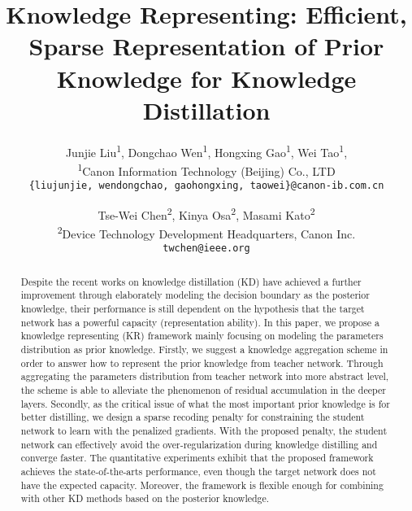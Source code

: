 \documentclass[10pt,twocolumn,letterpaper]{article}
\newcommand*{\affmark}[1][*]{\textsuperscript{#1}}
\begin{document}
\title{Knowledge Representing: Efficient, Sparse Representation of Prior Knowledge for Knowledge Distillation}

\author{
Junjie Liu\affmark[1],
Dongchao Wen\affmark[1],
Hongxing Gao\affmark[1],
Wei Tao\affmark[1],\\
\affmark[1]{Canon Information Technology (Beijing) Co., LTD}\\
{\tt\small \{liujunjie, wendongchao, gaohongxing, taowei\}@canon-ib.com.cn}
\and
Tse-Wei Chen\affmark[2],
Kinya Osa\affmark[2],
Masami Kato\affmark[2]\\
\affmark[2]{Device Technology Development Headquarters, Canon Inc.}\\
{\tt\small twchen@ieee.org}
}

\maketitle
\thispagestyle{empty}

\begin{abstract}
  Despite the recent works on knowledge distillation (KD) have achieved
  a further improvement through elaborately modeling
  the decision boundary as the posterior knowledge,
  their performance is still dependent on the hypothesis that
  the target network has a powerful capacity (representation ability).
  In this paper,
  we propose a knowledge representing (KR) framework mainly
  focusing on modeling the parameters distribution as prior knowledge.
  Firstly,
  we suggest a knowledge aggregation scheme
  in order to answer how to represent the prior knowledge from teacher network.
  Through aggregating the parameters distribution from
  teacher network into more abstract level,
  the scheme is able to alleviate the phenomenon of
  residual accumulation in the deeper layers.
  Secondly,
  as the critical issue of
  what the most important prior knowledge is for better distilling,
  we design a sparse recoding penalty for constraining
  the student network to learn with the penalized gradients.
  With the proposed penalty,
  the student network can effectively avoid
  the over-regularization during knowledge distilling and converge faster.
  The quantitative experiments exhibit that
  the proposed framework achieves the state-of-the-arts performance,
  even though the target network does not have the expected capacity.
  Moreover,
  the framework is flexible enough for combining with
  other KD methods based on the posterior knowledge.
\end{abstract}
\end{document}
